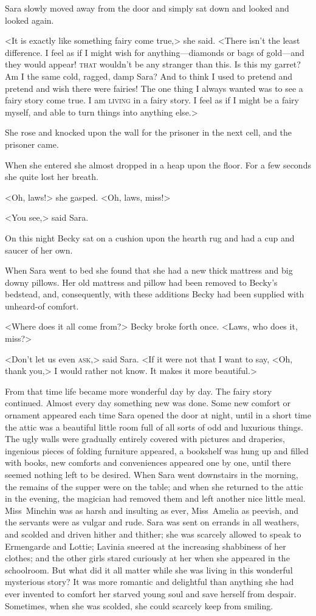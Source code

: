 Sara slowly moved away from the door and simply sat down and looked and looked again.

<It is exactly like something fairy come true,> she said. <There isn't the least difference. I feel as if I might wish for anything—diamonds or bags of gold—and they would appear! \textsc{that} wouldn't be any stranger than this. Is this my garret? Am I the same cold, ragged, damp Sara? And to think I used to pretend and pretend and wish there were fairies! The one thing I always wanted was to see a fairy story come true. I am \textsc{living} in a fairy story. I feel as if I might be a fairy myself, and able to turn things into anything else.>

She rose and knocked upon the wall for the prisoner in the next cell, and the prisoner came.

When she entered she almost dropped in a heap upon the floor. For a few seconds she quite lost her breath.

<Oh, laws!> she gasped. <Oh, laws, miss!>

<You see,> said Sara.

On this night Becky sat on a cushion upon the hearth rug and had a cup and saucer of her own.

When Sara went to bed she found that she had a new thick mattress and big downy pillows. Her old mattress and pillow had been removed to Becky's bedstead, and, consequently, with these additions Becky had been supplied with unheard-of comfort.

<Where does it all come from?> Becky broke forth once. <Laws, who does it, miss?>

<Don't let us even \textsc{ask},> said Sara. <If it were not that I want to say, <Oh, thank you,> I would rather not know. It makes it more beautiful.>

From that time life became more wonderful day by day. The fairy story continued. Almost every day something new was done. Some new comfort or ornament appeared each time Sara opened the door at night, until in a short time the attic was a beautiful little room full of all sorts of odd and luxurious things. The ugly walls were gradually entirely covered with pictures and draperies, ingenious pieces of folding furniture appeared, a bookshelf was hung up and filled with books, new comforts and conveniences appeared one by one, until there seemed nothing left to be desired. When Sara went downstairs in the morning, the remains of the supper were on the table; and when she returned to the attic in the evening, the magician had removed them and left another nice little meal. Miss~Minchin was as harsh and insulting as ever, Miss~Amelia as peevish, and the servants were as vulgar and rude. Sara was sent on errands in all weathers, and scolded and driven hither and thither; she was scarcely allowed to speak to Ermengarde and Lottie; Lavinia sneered at the increasing shabbiness of her clothes; and the other girls stared curiously at her when she appeared in the schoolroom. But what did it all matter while she was living in this wonderful mysterious story? It was more romantic and delightful than anything she had ever invented to comfort her starved young soul and save herself from despair. Sometimes, when she was scolded, she could scarcely keep from smiling.

